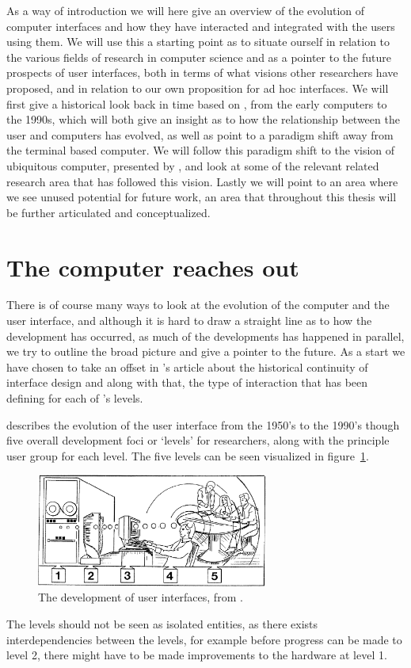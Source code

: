 As a way of introduction we will here give an overview of the evolution of computer interfaces and how they have interacted and integrated with the users using them.
We will use this a starting point as to situate ourself in relation to the various fields of research in computer science and as a pointer to the future prospects of user interfaces, both in terms of what visions other researchers have proposed, and in relation to our own proposition for ad hoc interfaces.
We will first give a historical look back in time based on \citet{grudin1990computer}, from the early computers to the 1990s, which will both give an insight as to how the relationship between the user and computers has evolved, as well as point to a paradigm shift away from the terminal based computer.
We will follow this paradigm shift to the vision of ubiquitous computer, presented by \citet{weiser1991computer}, and look at some of the relevant related research area that has followed this vision.
Lastly we will point to an area where we see unused potential for future work, an area that throughout this thesis will be further articulated and conceptualized.   

\section{The computer reaches out}
There is of course many ways to look at the evolution of the computer and the user interface, and although it is hard to draw a straight line as to how the development has occurred, as much of the developments has happened in parallel, we try to outline the broad picture and give a pointer to the future.
As a start we have chosen to take an offset in \citeauthor{grudin1990computer}'s article about the historical continuity of interface design \citep{grudin1990computer} and along with that, the type of interaction that has been defining for each of \citeauthor{grudin1990computer}'s levels.

\citeauthor{grudin1990computer} describes the evolution of the user interface from the 1950's to the 1990's though five overall development foci or `levels' for researchers, along with the principle user group for each level.
The five levels can be seen visualized in figure~\ref{foci-interface}.

\begin{figure}[h]
	\centering
  		\includegraphics[width=3in]{figures/foci-interface}
	\caption[The development of user interfaces \citep{grudin1990computer}.]
   {The development of user interfaces, from \citep{grudin1990computer}.}
   \label{foci-interface}
\end{figure}
The levels should not be seen as isolated entities, as there exists interdependencies between the levels, for example before progress can be made to level 2, there might have to be made improvements to the hardware at level 1.

